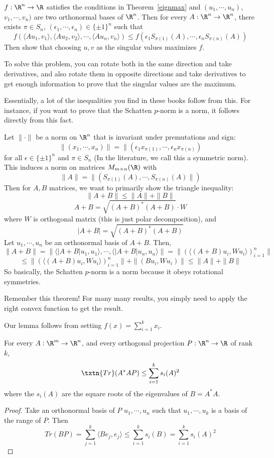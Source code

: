 \begin{ex} $f:\R^n \to \R$ satisfies the conditions in Theorem~\ref{eignmax} and $(u_1, \cdots, u_n)$, $v_1, \cdots, v_n)$ are two orthonormal bases of $\R^n$. Then for every $A: \R^n \to \R^n$, there exists $\pi \in S_n$, $(\epsilon_1, \cdots, \epsilon_n) \in \{\pm 1\}^n$ such that
\[
f(\langle Au_1, v_1\rangle, \langle Au_2, v_2\rangle, \cdots, \langle Au_n, v_n \rangle) \leq f(\epsilon_1S_{\pi(1)}(A), \cdots, \epsilon_nS_{\pi(n)}(A))
\]
Then show that choosing $u, v$ as the singular values maximizes $f$. 
\end{ex}
To solve this problem, you can rotate both in the same direction and take derivatives, and also rotate them in opposite directions and take derivatives to get enough information to prove that the singular values are the maximum. 

Essentially, a lot of the inequalities you find in these books follow from this. For instance, if you want to prove that the Schatten $p$-norm is a norm, it follows directly from this fact. 
\begin{cor}
Let $\|\cdot\|$ be a norm on $\R^n$ that is invariant under premutations and sign: 
\[
\|(x_1, \cdots, x_n)\| = \|(\epsilon_1x_{\pi(1)}, \cdots, \epsilon_nx_{\pi(n)})
\]
for all $\epsilon \in \{\pm 1\}^n$ and $\pi \in S_n$
(In the literature, we call this a symmetric norm). 
This induces a norm on matrices $M_{m \times n}(\R)$ with 
\[
\|A\| = \|(S_{\pi(1)}(A), \cdots, S_{\pi(n)}(A)\|)
\]
Then for $A, B$ matrices, we want to primarily show the triangle inequality: 
\[
\|A + B\| \leq \|A\| + \|B\|
\]
\[
A + B = \sqrt{(A + B)^*(A + B)} \cdot W
\]
where $W$ is orthogonal matrix (this is just polar decomposition), and 
\[
|A + B| = \sqrt{(A + B)^*(A + B)}
\]
Let $u_1, \cdots, u_n$ be an orthonormal basis of $A+ B$. Then, 
\[
\|A + B\| = \|\langle |A + B|u_1, u_1 \rangle, \cdots, \langle |A + B|u_n, u_n \rangle\| = \|(\langle (A +  B)u_i, Wu_i\rangle)_{i = 1}^n \|
\]
\[
\leq \|(\langle (A +  B)u_i, Wu_i\rangle)_{i = 1}^n \| + \|(Bu_i, Wu_i)\| \leq \|A\| + \|B\|
\]
So basically, the Schatten $p$-norm is a norm because it obeys rotational symmetries. 
\end{cor}

Remember this theorem! For many many results, you simply need to apply the right convex function to get the result. 

Our lemma follows from setting $f(x) = \sum_{i = 1}^k x_i$. 
\begin{lem}
For every $A: \R^m \to \R^n$, and every orthogonal projection $P: \R^n \to \R$ of rank $k$, 
\[
\txtn{Tr}(A^*AP) \leq \sum_{i = 1}^k s_i(A)^2
\]
where the $s_i(A)$ are the square roots of the eigenvalues of $B = A^*A$. 
\end{lem}
\begin{proof}
Take an orthonormal basis of $P$ $u_1, \cdots, u_n$ such that $u_1, \cdots, u_k$ is a basis of the range of $P$. Then
\[
Tr(BP) = \sum_{j = 1}^k \langle  Be_j, e_j \rangle \leq \sum_{i = 1}^k s_i(B) = \sum_{i = 1}^k s_i(A)^2
\]
\end{proof}

